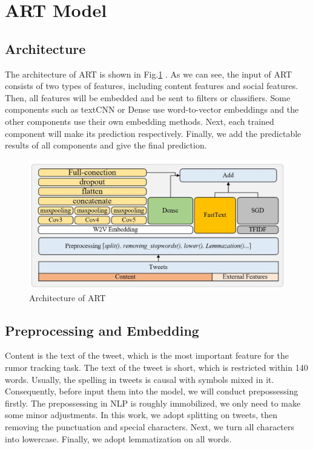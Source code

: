 \section{ART Model}
\label{sec:model}

\subsection{Architecture}
\label{sec:architecture}
The architecture of ART is shown in Fig.\ref{fig:architecture} . As we can see, the input of  ART consists of two types of features, including content features and social features. Then, all features will be embedded and be sent to filters or classifiers.  Some components such as textCNN or Dense use word-to-vector embeddings and the other components use their own embedding methods. Next, each trained component will make its prediction respectively. Finally, we add the predictable results of all components and give the final prediction. 

\begin{figure}[tbp]
	\hspace{0ex}
	\vspace{0ex}
	\centering
	\includegraphics[width = \textwidth]{fig/architecture}
	\caption{Architecture of ART}
	\label{fig:architecture}
\end{figure}

\subsection{Preprocessing and Embedding}
Content is the text of the tweet, which is the most important feature for the rumor tracking task. The text of the tweet is short, which is restricted within 140 words. Usually, the spelling in tweets is causal with symbols mixed in it. Consequently, before input them into the model, we will conduct prepossessing firstly. The prepossessing in NLP is roughly immobilized, we only need to make some minor adjustments. In this work, we adopt splitting on tweets, then removing the punctuation and special characters. Next, we turn all characters into lowercase. Finally, we adopt lemmatization on all words.
 
